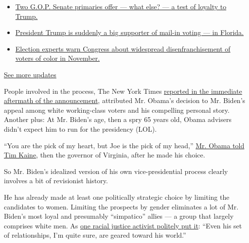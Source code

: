 \begin{itemize}
\tightlist
\item
  \href{https://www.nytimes.com/2020/08/04/us/elections/primary-election-michigan-arizona-kansas.html?action=click\&pgtype=Article\&state=default\&region=MAIN_CONTENT_1\&context=storylines_live_updates\#link-3924dd44}{Two
  G.O.P. Senate primaries offer --- what else? --- a test of loyalty to
  Trump.}
\item
  \href{https://www.nytimes.com/2020/08/04/us/elections/primary-election-michigan-arizona-kansas.html?action=click\&pgtype=Article\&state=default\&region=MAIN_CONTENT_1\&context=storylines_live_updates\#link-32b39e33}{President
  Trump is suddenly a big supporter of mail-in voting --- in Florida.}
\item
  \href{https://www.nytimes.com/2020/08/04/us/elections/primary-election-michigan-arizona-kansas.html?action=click\&pgtype=Article\&state=default\&region=MAIN_CONTENT_1\&context=storylines_live_updates\#link-6d019753}{Election
  experts warn Congress about widespread disenfranchisement of voters of
  color in November.}
\end{itemize}

\href{https://www.nytimes.com/2020/08/04/us/elections/primary-election-michigan-arizona-kansas.html?action=click\&pgtype=Article\&state=default\&region=MAIN_CONTENT_1\&context=storylines_live_updates}{See
more updates}

People involved in the process, The New York Times
\href{https://www.nytimes.com/2008/08/24/us/politics/24deconstruct.html?_r=1\&hp=\&adxnnl=1\&oref=slogin\&adxnnlx=1219585399-mopoNQ9Taivokt1V0PHsig}{reported
in the immediate aftermath of the announcement}, attributed Mr. Obama's
decision to Mr. Biden's appeal among white working-class voters and his
compelling personal story. Another plus: At Mr. Biden's age, then a spry
65 years old, Obama advisers didn't expect him to run for the presidency
(LOL).

``You are the pick of my heart, but Joe is the pick of my head,''
\href{https://www.nytimes.com/2019/08/16/us/politics/biden-obama-history.html}{Mr.
Obama told Tim Kaine}, then the governor of Virginia, after he made his
choice.

So Mr. Biden's idealized version of his own vice-presidential process
clearly involves a bit of revisionist history.

He has already made at least one politically strategic choice by
limiting the candidates to women. Limiting the prospects by gender
eliminates a lot of Mr. Biden's most loyal and presumably ``simpatico''
allies --- a group that largely comprises white men. As
\href{https://www.washingtonpost.com/politics/biden-under-pressure-to-shatter-cement-ceiling-by-naming-a-black-woman-to-be-his-running-mate/2020/07/19/7dfb9dcc-c06f-11ea-9fdd-b7ac6b051dc8_story.html}{one
racial justice activist politely put it}: ``Even his set of
relationships, I'm quite sure, are geared toward his world.''

